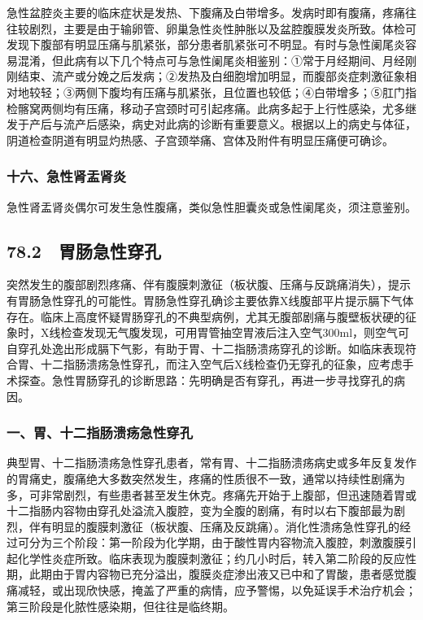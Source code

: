 急性盆腔炎主要的临床症状是发热、下腹痛及白带增多。发病时即有腹痛，疼痛往往较剧烈，主要是由于输卵管、卵巢急性炎性肿胀以及盆腔腹膜发炎所致。体检可发现下腹部有明显压痛与肌紧张，部分患者肌紧张可不明显。有时与急性阑尾炎容易混淆，但此病有以下几个特点可与急性阑尾炎相鉴别：①常于月经期间、月经刚刚结束、流产或分娩之后发病；②发热及白细胞增加明显，而腹部炎症刺激征象相对地较轻；③两侧下腹均有压痛与肌紧张，且位置也较低；④白带增多；⑤肛门指检髂窝两侧均有压痛，移动子宫颈时可引起疼痛。此病多起于上行性感染，尤多继发于产后与流产后感染，病史对此病的诊断有重要意义。根据以上的病史与体征，阴道检查阴道有明显灼热感、子宫颈举痛、宫体及附件有明显压痛便可确诊。

\subsubsection{十六、急性肾盂肾炎}

急性肾盂肾炎偶尔可发生急性腹痛，类似急性胆囊炎或急性阑尾炎，须注意鉴别。

\protect\hypertarget{text00195.html}{}{}

\subsection{78.2　胃肠急性穿孔}

突然发生的腹部剧烈疼痛、伴有腹膜刺激征（板状腹、压痛与反跳痛消失），提示有胃肠急性穿孔的可能性。胃肠急性穿孔确诊主要依靠X线腹部平片提示膈下气体存在。临床上高度怀疑胃肠穿孔的不典型病例，尤其无腹部剧痛与腹壁板状硬的征象时，X线检查发现无气腹发现，可用胃管抽空胃液后注入空气300ml，则空气可自穿孔处逸出形成膈下气影，有助于胃、十二指肠溃疡穿孔的诊断。如临床表现符合胃、十二指肠溃疡急性穿孔，而注入空气后X线检查仍无穿孔的征象，应考虑手术探查。急性胃肠穿孔的诊断思路：先明确是否有穿孔，再进一步寻找穿孔的病因。

\subsubsection{一、胃、十二指肠溃疡急性穿孔}

典型胃、十二指肠溃疡急性穿孔患者，常有胃、十二指肠溃疡病史或多年反复发作的胃痛史，腹痛绝大多数突然发生，疼痛的性质很不一致，通常以持续性剧痛为多，可非常剧烈，有些患者甚至发生休克。疼痛先开始于上腹部，但迅速随着胃或十二指肠内容物由穿孔处溢流入腹腔，变为全腹的剧痛，有时以右下腹部最为剧烈，伴有明显的腹膜刺激征（板状腹、压痛及反跳痛）。消化性溃疡急性穿孔的经过可分为三个阶段：第一阶段为化学期，由于酸性胃内容物流入腹腔，刺激腹膜引起化学性炎症所致。临床表现为腹膜刺激征；约几小时后，转入第二阶段的反应性期，此期由于胃内容物已充分溢出，腹膜炎症渗出液又已中和了胃酸，患者感觉腹痛减轻，或出现欣快感，掩盖了严重的病情，应予警惕，以免延误手术治疗机会；第三阶段是化脓性感染期，但往往是临终期。

